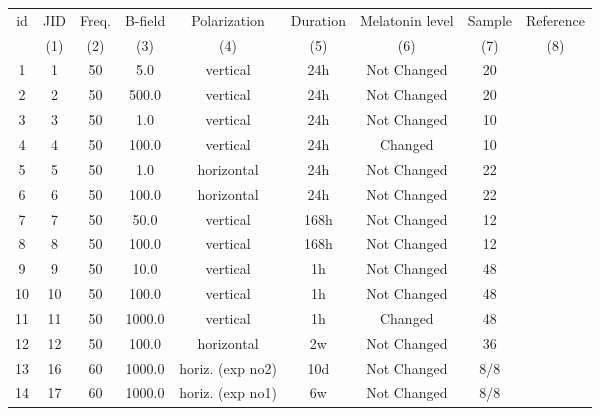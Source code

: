 \begin{tabular}{ccccccccc}
id & JID  & Freq. & B-field & Polarization & Duration & Melatonin level  & Sample &  Reference  \\
&(1) & (2) & (3) & (4)  & (5)  & (6) & (7) & (8) \\
\hline
1& 1 & 50 & 5.0 & vertical & 24h & Not Changed  & 20 &	\citet{Bakos1995} \\
2& 2 & 50 & 500.0 & vertical & 24h & Not Changed  & 20 & \citet{Bakos1995} \\
3& 3 & 50 & 1.0 & vertical & 24h & Not Changed  & 10 &	\citet{Bakos1997} \\
4& 4 & 50 & 100.0 & vertical & 24h & Changed  & 10 & 	\citet{Bakos1997} \\
5& 5 & 50 & 1.0 & horizontal & 24h & Not Changed  & 22 &\citet{Bakos1999} \\
6& 6 & 50 & 100.0 & horizontal & 24h & Not Changed  & 22 & \citet{Bakos1999} \\
7& 7 & 50 & 50.0 & vertical & 168h & Not Changed  &12 & \citet{Bakos2002} \\
8& 8 & 50 & 100.0 & vertical & 168h & Not Changed  & 12 &\citet{Bakos2002}\\
9& 9 & 50 & 10.0 & vertical & 1h & Not Changed    & 48 & \citet{Chacon2000} \\
10& 10 & 50 & 100.0 & vertical & 1h & Not Changed  & 48 & \citet{Chacon2000} \\
11& 11 & 50 & 1000.0 & vertical & 1h & Changed    & 48 & \citet{Chacon2000} \\
12& 12 & 50 & 100.0 & horizontal & 2w & Not Changed & 36  & \citet{Fedrowitz2002} \\
13& 16 & 60 & 1000.0 & horiz. (exp no2) & 10d & Not Changed  &  8/8 &\citet{John1998} \\
14& 17 & 60 & 1000.0 & horiz. (exp no1) & 6w & Not Changed  &  8/8 & \citet{John1998} \\

\end{tabular}

